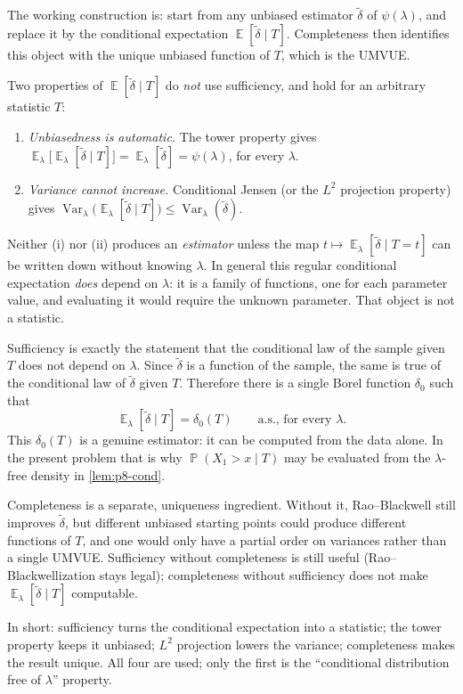 \documentclass[11pt,a4paper]{article}
\DeclareMathOperator{\Var}{Var}
\DeclareMathOperator{\E}{\mathbb{E}}
\DeclareMathOperator{\Pbb}{\mathbb{P}}
\begin{document}
\begin{remark*}
The working construction is: start from any unbiased estimator \(\tilde\delta\) of \(\psi(\lambda)\), and replace it by the conditional expectation \(\E[\tilde\delta\mid T]\). Completeness then identifies this object with the unique unbiased function of \(T\), which is the UMVUE.

Two properties of \(\E[\tilde\delta\mid T]\) do \emph{not} use sufficiency, and hold for an arbitrary statistic \(T\):
\begin{enumerate}[label=(\roman*)]
    \item
    \emph{Unbiasedness is automatic.} The tower property gives \(\E_\lambda\bigl[\E_\lambda[\tilde\delta\mid T]\bigr]=\E_\lambda[\tilde\delta]=\psi(\lambda)\), for every \(\lambda\).
    \item
    \emph{Variance cannot increase.} Conditional Jensen (or the \(L^2\) projection property) gives \(\Var_\lambda\bigl(\E_\lambda[\tilde\delta\mid T]\bigr)\le\Var_\lambda(\tilde\delta)\).
\end{enumerate}
Neither (i) nor (ii) produces an \emph{estimator} unless the map \(t\mapsto\E_\lambda[\tilde\delta\mid T=t]\) can be written down without knowing \(\lambda\). In general this regular conditional expectation \emph{does} depend on \(\lambda\): it is a family of functions, one for each parameter value, and evaluating it would require the unknown parameter. That object is not a statistic.

Sufficiency is exactly the statement that the conditional law of the sample given \(T\) does not depend on \(\lambda\). Since \(\tilde\delta\) is a function of the sample, the same is true of the conditional law of \(\tilde\delta\) given \(T\). Therefore there is a single Borel function \(\delta_0\) such that
\[
\E_\lambda[\tilde\delta\mid T]
=
\delta_0(T)
\qquad\text{a.s., for every }\lambda.
\]
This \(\delta_0(T)\) is a genuine estimator: it can be computed from the data alone. In the present problem that is why \(\Pbb(X_1>x\mid T)\) may be evaluated from the \(\lambda\)-free density in \cref{lem:p8-cond}.

Completeness is a separate, uniqueness ingredient. Without it, Rao--Blackwell still improves \(\tilde\delta\), but different unbiased starting points could produce different functions of \(T\), and one would only have a partial order on variances rather than a single UMVUE. Sufficiency without completeness is still useful (Rao--Blackwellization stays legal); completeness without sufficiency does not make \(\E_\lambda[\tilde\delta\mid T]\) computable.

In short: sufficiency turns the conditional expectation into a statistic; the tower property keeps it unbiased; \(L^2\) projection lowers the variance; completeness makes the result unique. All four are used; only the first is the ``conditional distribution free of \(\lambda\)'' property.
\end{remark*}
\end{document}
